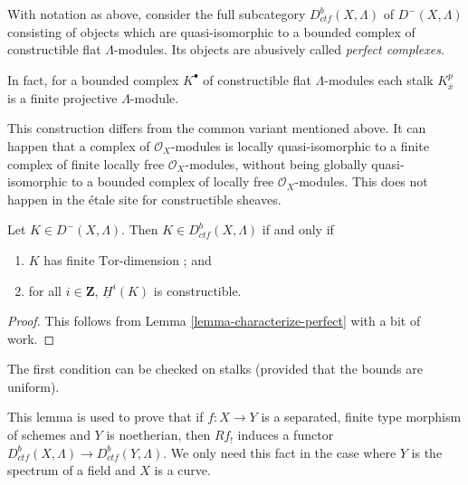 \begin{definition}
\label{definition-ctf}
With notation as above,
consider the full subcategory $D_{ctf}^b (X, \Lambda)$ of $D^-(X, \Lambda)$
consisting of objects which are quasi-isomorphic to a bounded complex of
constructible flat $\Lambda$-modules. Its objects are abusively called
{\it perfect complexes}.
\end{definition}

\begin{remark}
\label{remark-projective-each-degree}
In fact, for a bounded complex $K^\bullet$ of constructible flat
$\Lambda$-modules each stalk $K^p_{\overline{x}}$ is a finite projective
$\Lambda$-module.
\end{remark}

\begin{remark}
\label{remark-different}
This construction differs from the common variant mentioned above. It can
happen that a complex of $\mathcal{O}_X$-modules is locally quasi-isomorphic to
a finite complex of finite locally free $\mathcal{O}_X$-modules, without being
globally quasi-isomorphic to a bounded complex of locally free
$\mathcal{O}_X$-modules. This does not happen in the \'etale site for
constructible sheaves.
\end{remark}

\begin{lemma}
\label{lemma-when-ctf}
Let $K\in D^-(X, \Lambda)$. Then $K\in D_{ctf}^b(X, \Lambda)$ if and only if
\begin{enumerate}
\item
$K$ has finite $\text{Tor}$-dimension ; and
\item
for all $i \in \mathbf{Z}$, $\underline{H}^i(K)$ is constructible.
\end{enumerate}
\end{lemma}

\begin{proof}
This follows from Lemma \ref{lemma-characterize-perfect} with a bit of
work.
\end{proof}

\noindent
The first condition can be checked on stalks (provided that the bounds are
uniform).

\begin{remark}
\label{remark-how-used}
This lemma is used to prove that if $f: X \to Y$ is a separated, finite type
morphism of schemes and $Y$ is noetherian, then $Rf_!$ induces a functor
$D_{ctf}^b(X, \Lambda) \to D_{ctf}^b (Y, \Lambda)$. We only need this fact in
the case where $Y$ is the spectrum of a field and $X$ is a curve.
\end{remark}

